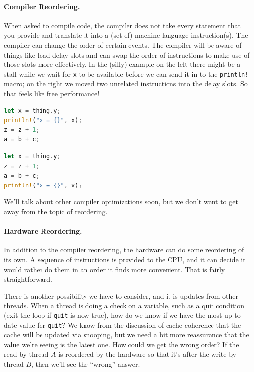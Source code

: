 \documentclass[a4paper]{report}
\begin{document}
\paragraph{Compiler Reordering.} When asked to compile code, the compiler does not take every statement that you provide and translate it into a (set of) machine language instruction(s). The compiler can change the order of certain events. The compiler will be aware of things like load-delay slots and can swap the order of instructions to make use of those slots more effectively. In the (silly) example on the left there might be a stall while we wait for \texttt{x} to be available before we can send it in to the \texttt{println!} macro; on the right we moved two unrelated instructions into the delay slots. So that feels like free performance! 

\begin{multicols}{2}
\begin{lstlisting}[language=Rust]
let x = thing.y;
println!("x = {}", x);
z = z + 1;
a = b + c;
\end{lstlisting}
\columnbreak
\begin{lstlisting}[language=Rust]
let x = thing.y;
z = z + 1;
a = b + c;
println!("x = {}", x);
\end{lstlisting}
\end{multicols}

We'll talk about other compiler optimizations soon, but we don't want to get away from the topic of reordering. 

\paragraph{Hardware Reordering.} In addition to the compiler reordering, the hardware can do some reordering of its own. A sequence of instructions is provided to the CPU, and it can decide it would rather do them in an order it finds more convenient. That is fairly straightforward.

There is another possibility we have to consider, and it is updates from other threads. When a thread is doing a check on a variable, such as a quit condition (exit the loop if \texttt{quit} is now true), how do we know if we have the most up-to-date value for \texttt{quit}? We know from the discussion of cache coherence that the cache will be updated via snooping, but we need a bit more reassurance that the value we're seeing is the latest one. How could we get the wrong order? If the read by thread $A$ is reordered by the hardware so that it's after the write by thread $B$, then we'll see the ``wrong'' answer. 
\end{document}
